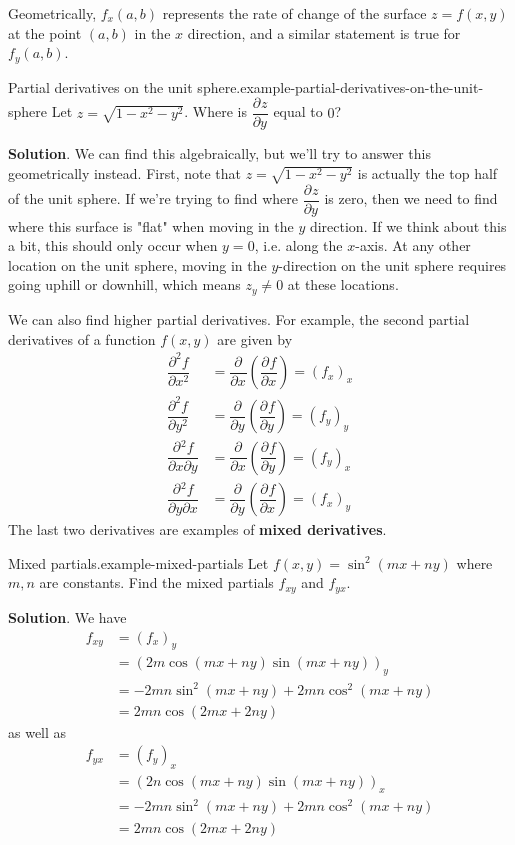 \documentclass[10pt,]{book}
\newcommand{\terminology}[1]{\textbf{#1}}
\numberwithin{equation}{section}
\newcommand{\pdv}[3][]{\dfrac{\partial^{#1} #2}{\partial #3^{#1}}}
\begin{document}
\hypertarget{p-1358}{}%
Geometrically, \(f_{x}(a,b)\) represents the rate of change of the surface \(z = f(x,y)\) at the point \((a,b)\) in the \(x\) direction, and a similar statement is true for \(f_{y}(a,b)\).%
\begin{example}{Partial derivatives on the unit sphere.}{example-partial-derivatives-on-the-unit-sphere}%
\hypertarget{p-1359}{}%
Let \(z = \sqrt{1-x^{2} - y^{2}}\). Where is \(\pdv{z}{y}\) equal to \(0\)?%
\par\smallskip%
\noindent\textbf{Solution}.\hypertarget{solution-218}{}\quad%
\hypertarget{p-1360}{}%
We can find this algebraically, but we'll try to answer this geometrically instead. First, note that \(z = \sqrt{1 - x^{2} - y^{2}}\) is actually the top half of the unit sphere. If we're trying to find where \(\pdv{z}{y}\) is zero, then we need to find where this surface is "flat" when moving in the \(y\) direction. If we think about this a bit, this should only occur when \(y=0\), i.e. along the \(x\)-axis. At any other location on the unit sphere, moving in the \(y\)-direction on the unit sphere requires going uphill or downhill, which means \(z_{y}\neq0\) at these locations.%
\end{example}
\hypertarget{p-1361}{}%
We can also find higher partial derivatives. For example, the second partial derivatives of a function \(f(x,y)\) are given by%
\begin{align*}
\pdv[2]{f}{x} & = \pdv{}{x}\left(\pdv{f}{x}\right) = (f_{x})_{x} \\
\pdv[2]{f}{y} & = \pdv{}{y}\left(\pdv{f}{y}\right) = (f_{y})_{y} \\
\pdv{{}^{2}f}{x\partial y} & = \pdv{}{x}\left(\pdv{f}{y}\right) = (f_{y})_{x} \\
\pdv{{}^{2}f}{y\partial x} & = \pdv{}{y}\left(\pdv{f}{x}\right) = (f_{x})_{y} 
\end{align*}
The last two derivatives are examples of \terminology{mixed derivatives}.%
\begin{example}{Mixed partials.}{example-mixed-partials}%
\hypertarget{p-1362}{}%
Let \(f(x,y) = \sin^{2}(mx+ny)\) where \(m,n\) are constants. Find the mixed partials \(f_{xy}\) and \(f_{yx}\).%
\par\smallskip%
\noindent\textbf{Solution}.\hypertarget{solution-219}{}\quad%
\hypertarget{p-1363}{}%
We have%
\begin{align*}
f_{xy} & = (f_{x})_{y} \\
& = (2m\cos(mx+ny)\sin(mx+ny))_{y} \\
& = -2mn\sin^{2}(mx+ny) + 2mn\cos^{2}(mx+ny) \\
& = 2mn\cos(2mx+2ny) 
\end{align*}
as well as%
\begin{align*}
f_{yx} & = (f_{y})_{x} \\
& = (2n\cos(mx+ny)\sin(mx+ny))_{x} \\
& = -2mn\sin^{2}(mx+ny) + 2mn\cos^{2}(mx+ny) \\
& = 2mn\cos(2mx+2ny) 
\end{align*}
%
\end{example}
\end{document}
